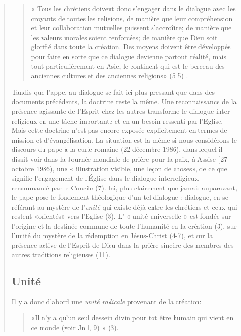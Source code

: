 \begin{quote}
\begin{quote}
    « Tous les chrétiens doivent donc s'engager dans
le dialogue avec les croyants de toutes les religions, de manière
que leur compréhension et leur collaboration mutuelles puissent
s'accroître; de manière que les valeurs morales soient renforcées;
de manière que Dieu soit glorifié dans toute la
création. Des moyens doivent être développés pour faire en
sorte que ce dialogue devienne partout réalité, mais tout particulièrement
en Asie, le continent qui est le berceau des
anciennes cultures et des anciennes religions» (5 5) .
\end{quote}
Tandis que l'appel au dialogue se fait ici plus pressant que
dans des documents précédents, la doctrine reste la même.
Une reconnaissance de la présence agissante de l'Esprit chez 
les autres transforme le dialogue inter-religieux en une tâche
importante et en un besoin ressenti par l'Eglise. Mais cette
doctrine n'est pas encore exposée explicitement en termes de
mission et d'évangélisation.
La situation est la même si nous considérons le discours du
pape à la curie romaine (22 décembre 1986), dans lequel il
disait voir dans la Journée mondiale de prière pour la paix, à
Assise (27 octobre 1986), une « illustration visible, une leçon
de choses», de ce que signifie l'engagement de l'Église dans
le dialogue interreligieux, recommandé par le Concile (7). Ici,
plus clairement que jamais auparavant, le pape pose le fondement 
théologique d'un tel dialogue :  dialogue, en se référant au mystère
de l'\textit{unité} qui existe déjà entre les chrétiens et ceux qui restent
«orientés» vers l'Eglise (8). L' « unité universelle » est
fondée sur l'origine et la destinée commune de toute l'humanité
en la création (3), sur l'unité du mystère de la rédemption en Jésus-Christ (4-7), et sur la présence active de l'Esprit de Dieu dans la prière sincère des membres des autres traditions
religieuses (11).


\subsection{Unité}
Il y a donc d'abord une \textit{unité radicale} provenant de la
création:
\begin{quote}
    «Il n'y a qu'un seul dessein divin pour tot être
humain qui vient en ce monde (voir Jn l, 9) » (3). 


\end{quote}
\end{quote}
